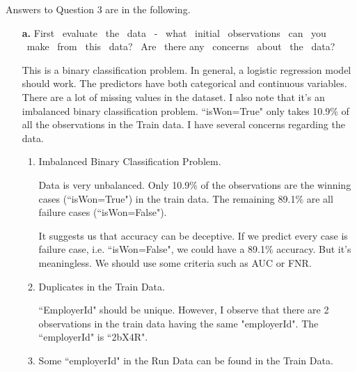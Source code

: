 \documentclass[12pt]{report}
\begin{document}
\noindent Answers to Question 3 are in the following.
\begin{enumerate}
	\item[\textbf{a.}] First  evaluate  the  data  -­  what  initial  observations  can  you  make  from  this  data?  Are  there  any  concerns  about  the  data?
	
	This is a binary classification problem. In general, a logistic regression model should work. The predictors have both categorical and continuous variables. There are a lot of missing values in the dataset. I also note that it's an imbalanced binary classification problem. ``isWon=True" only takes 10.9\% of all the observations in the Train data. I have several concerns regarding the data.
	
	\begin{enumerate}
		\item Imbalanced Binary Classification Problem.
		
		Data is very unbalanced. Only 10.9\% of the observations are the winning cases (``isWon=True") in the train data. The remaining 89.1\% are all failure cases (``isWon=False").
		
		\begin{table}[h!]
			\centering
			\caption{Case Proportion in the Train Data}
		\end{table}
		
		It suggests us that accuracy can be deceptive. If we predict every case is failure case, i.e. ``isWon=False", we could have a 89.1\% accuracy. But it's meaningless. We should use some criteria such as AUC or FNR.
		
		\item Duplicates in the Train Data.
		
		``EmployerId" should be unique. However, I observe that there are 2 observations in the train data having the same "employerId". The ``employerId" is ``2bX4R".
		
		\item Some ``employerId" in the Run Data can be found in the Train Data.
		

\end{enumerate}
\end{enumerate}
\end{document}
